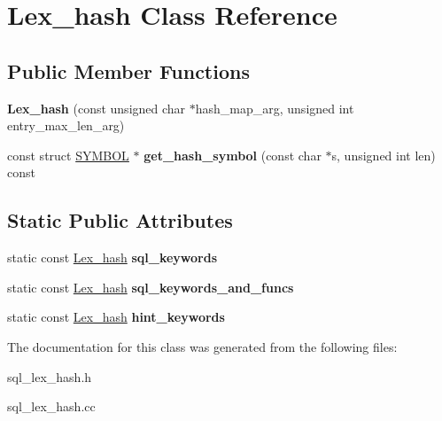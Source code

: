 \hypertarget{classLex__hash}{}\section{Lex\+\_\+hash Class Reference}
\label{classLex__hash}
\subsection*{Public Member Functions}
\begin{DoxyCompactItemize}
\item 
\mbox{\label{classLex__hash_ab354c29e78cd3f510e384c2792061f88}} 
{\bfseries Lex\+\_\+hash} (const unsigned char $\ast$hash\+\_\+map\+\_\+arg, unsigned int entry\+\_\+max\+\_\+len\+\_\+arg)
\item 
\mbox{\label{classLex__hash_ac1b96ef65fbf77b211012917911532f5}} 
const struct \mbox{\hyperlink{structSYMBOL}{S\+Y\+M\+B\+OL}} $\ast$ {\bfseries get\+\_\+hash\+\_\+symbol} (const char $\ast$s, unsigned int len) const
\end{DoxyCompactItemize}
\subsection*{Static Public Attributes}
\begin{DoxyCompactItemize}
\item 
\mbox{\label{classLex__hash_ae7ddad6c30b6cb3cb84563ef460ea7ab}} 
static const \mbox{\hyperlink{classLex__hash}{Lex\+\_\+hash}} {\bfseries sql\+\_\+keywords}
\item 
\mbox{\label{classLex__hash_a8d7af16016e1c46df60afff3668e17e3}} 
static const \mbox{\hyperlink{classLex__hash}{Lex\+\_\+hash}} {\bfseries sql\+\_\+keywords\+\_\+and\+\_\+funcs}
\item 
\mbox{\label{classLex__hash_a994ee040aa563103c4100d2cd1e34250}} 
static const \mbox{\hyperlink{classLex__hash}{Lex\+\_\+hash}} {\bfseries hint\+\_\+keywords}
\end{DoxyCompactItemize}


The documentation for this class was generated from the following files\+:\begin{DoxyCompactItemize}
\item 
sql\+\_\+lex\+\_\+hash.\+h\item 
sql\+\_\+lex\+\_\+hash.\+cc\end{DoxyCompactItemize}
